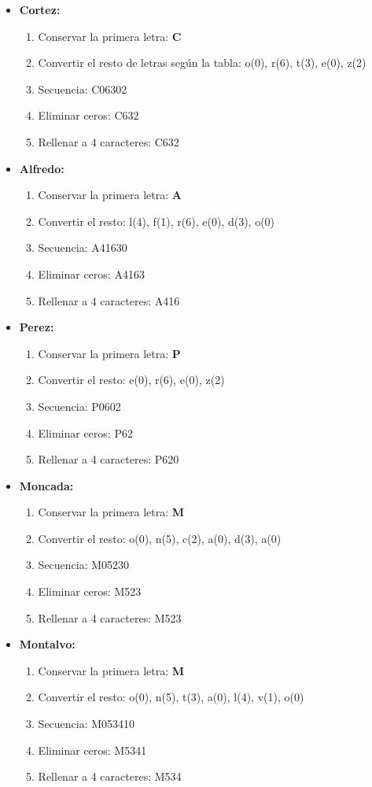 \documentclass{article}
\begin{document}
\begin{itemize}
    \item \textbf{Cortez:}
    \begin{enumerate}
        \item Conservar la primera letra: \textbf{C}
        \item Convertir el resto de letras según la tabla: o(0), r(6), t(3), e(0), z(2)
        \item Secuencia: C06302
        \item Eliminar ceros: C632
        \item Rellenar a 4 caracteres: C632
    \end{enumerate}
    \item \textbf{Alfredo:}
    \begin{enumerate}
        \item Conservar la primera letra: \textbf{A}
        \item Convertir el resto: l(4), f(1), r(6), e(0), d(3), o(0)
        \item Secuencia: A41630
        \item Eliminar ceros: A4163
        \item Rellenar a 4 caracteres: A416
    \end{enumerate}
    \item \textbf{Perez:}
    \begin{enumerate}
        \item Conservar la primera letra: \textbf{P}
        \item Convertir el resto: e(0), r(6), e(0), z(2)
        \item Secuencia: P0602
        \item Eliminar ceros: P62
        \item Rellenar a 4 caracteres: P620
    \end{enumerate}
    \item \textbf{Moncada:}
    \begin{enumerate}
        \item Conservar la primera letra: \textbf{M}
        \item Convertir el resto: o(0), n(5), c(2), a(0), d(3), a(0)
        \item Secuencia: M05230
        \item Eliminar ceros: M523
        \item Rellenar a 4 caracteres: M523
    \end{enumerate}
    \item \textbf{Montalvo:}
    \begin{enumerate}
        \item Conservar la primera letra: \textbf{M}
        \item Convertir el resto: o(0), n(5), t(3), a(0), l(4), v(1), o(0)
        \item Secuencia: M053410
        \item Eliminar ceros: M5341
        \item Rellenar a 4 caracteres: M534
    \end{enumerate}
\end{itemize}
\end{document}

